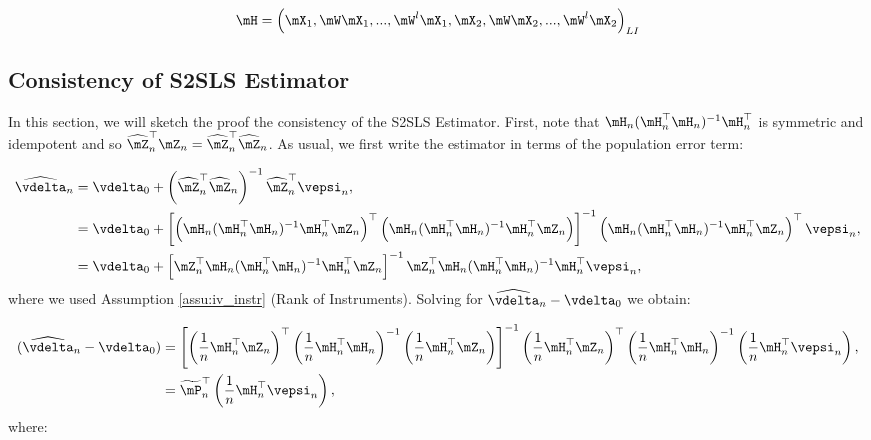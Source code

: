 \documentclass[english,12pt]{book}\usepackage[]{graphicx}\usepackage[]{xcolor}
\begin{document}
\begin{equation}
\mH = \left(\mX_1, \mW\mX_1, ..., \mW^l\mX_1, \mX_2, \mW\mX_2, ..., \mW^l\mX_2\right)_{LI}
\end{equation}

\subsection{Consistency of S2SLS Estimator}

In this section, we will sketch the proof the consistency of the S2SLS Estimator. First, note that $\mH_n(\mH_n^\top\mH_n)^{-1}\mH_n^\top$ is symmetric and idempotent and so $\widehat{\mZ}_n^\top\mZ_n= \widehat{\mZ}_n^\top\widehat{\mZ}_n$. As usual, we first write the estimator in terms of the population error term: 

\begin{equation}\label{eq:sampling_error_s2sls}
  \begin{aligned}
     \widehat{\vdelta}_n & =  \vdelta_0 + \left(\widehat{\mZ}^\top_n\widehat{\mZ}_n\right)^{-1}\widehat{\mZ}^\top_n\vepsi_n, \\
     & = \vdelta_0 + \left[\left(\mH_n(\mH^\top_n\mH_n)^{-1}\mH^\top_n\mZ_n\right)^\top\left(\mH_n(\mH^\top_n\mH_n)^{-1}\mH^\top_n\mZ_n\right)\right]^{-1}\left(\mH_n(\mH^\top_n\mH_n)^{-1}\mH^\top_n\mZ_n\right)^\top\vepsi_n, \\
     & = \vdelta_0 + \left[\mZ^\top_n \mH_n (\mH^\top_n\mH_n)^{-1}\mH^\top_n\mZ_n\right]^{-1}\mZ^\top_n\mH_n(\mH^\top_n\mH_n)^{-1}\mH^\top_n\vepsi_n,
  \end{aligned}
\end{equation}
%
where we used Assumption \ref{assu:iv_instr} (Rank of Instruments).  Solving for $\widehat{\vdelta}_{n} - \vdelta_0$ we obtain:

\begin{equation}\label{eq:asy_2sls_pr}
\begin{aligned}
(\widehat{\vdelta}_{n} - \vdelta_0) & = \left[\left(\frac{1}{n}\mH^\top_n\mZ _n\right)^\top\left(\frac{1}{n}\mH^\top_n\mH_n\right)^{-1}\left(\frac{1}{n}\mH^\top_n\mZ_n\right)\right]^{-1}\left(\frac{1}{n}\mH^\top_n\mZ_n\right)^\top\left(\frac{1}{n}\mH^\top_n\mH_n\right)^{-1}\left(\frac{1}{n}\mH^\top_n\vepsi_n\right), \\
             & = \widetilde{\mP}^\top_n\left(\frac{1}{n}\mH^\top_n\vepsi_n\right),
\end{aligned}
\end{equation}
%
where:
\end{document}
